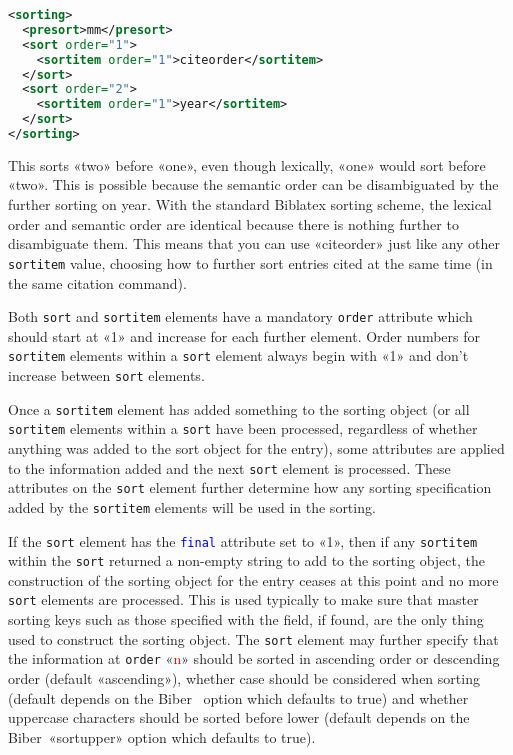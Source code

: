 \documentclass{ltxdockit}
\newcommand*{\biber}{Biber\xspace}
\newcommand*{\biblatex}{Biblatex\xspace}
\begin{document}
\begin{lstlisting}[language=xml,escapechar=+,mathescape=true]
<sorting>
  <presort>mm</presort>
  <sort order="1">
    <sortitem order="1">citeorder</sortitem>
  </sort>
  <sort order="2">
    <sortitem order="1">year</sortitem>
  </sort>
</sorting>
\end{lstlisting}
%
This sorts «two» before «one», even though lexically, «one» would sort
before «two». This is possible because the semantic order can be
disambiguated by the further sorting on year. With the standard \biblatex
{} sorting scheme, the lexical order and semantic order are identical because
there is nothing further to disambiguate them. This means that you can use
«citeorder» just like any other \texttt{sortitem} value, choosing
how to further sort entries cited at the same time (in the same citation
command).

Both \texttt{sort} and \texttt{sortitem} elements have a mandatory \texttt{order}
attribute which should start at «1» and increase for each further element.
Order numbers for \texttt{sortitem} elements within a \texttt{sort} element
always begin with «1» and don't increase between \texttt{sort} elements.

Once a \texttt{sortitem} element has added something to the sorting object
(or all \texttt{sortitem} elements within a \texttt{sort} have been
processed, regardless of whether anything was added to the sort object for
the entry), some attributes are applied to the information added and the
next \texttt{sort} element is processed. These attributes on the
\texttt{sort} element further determine how any sorting specification added
by the \texttt{sortitem} elements will be used in the sorting.

If the \texttt{sort} element has the \textcolor{blue}{\texttt{final}}
attribute set to «1», then if any \texttt{sortitem} within the
\texttt{sort} returned a non-empty string to add to the sorting object, the
construction of the sorting object for the entry ceases at this point and
no more \texttt{sort} elements are processed. This is used typically to
make sure that master sorting keys such as those specified with the
 field, if found, are the only thing used to construct
the sorting object. The \texttt{sort} element may further specify that the
information at \texttt{order} «\textcolor{red}{n}» should be sorted in ascending order or
descending order (default «ascending»), whether case
should be considered when sorting (default depends on the \biber\
 option which defaults to true)
and whether uppercase characters should be sorted before lower
(default depends on the \biber\ «sortupper» option which defaults to true).
\end{document}
